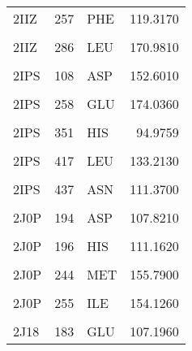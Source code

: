 \begin{table}
\begin{tabular}{lrlr}
			2IIZ & 257 & PHE & 119.3170\\
			\cellcolor{gray!6}{2IIZ} & \cellcolor{gray!6}{284} & \cellcolor{gray!6}{ASP} & \cellcolor{gray!6}{144.2720}\\
			\addlinespace
			2IIZ & 286 & LEU & 170.9810\\
			\cellcolor{gray!6}{2IPS} & \cellcolor{gray!6}{105} & \cellcolor{gray!6}{GLN} & \cellcolor{gray!6}{100.5170}\\
			2IPS & 108 & ASP & 152.6010\\
			\cellcolor{gray!6}{2IPS} & \cellcolor{gray!6}{109} & \cellcolor{gray!6}{HIS} & \cellcolor{gray!6}{93.6174}\\
			2IPS & 258 & GLU & 174.0360\\
			\addlinespace
			\cellcolor{gray!6}{2IPS} & \cellcolor{gray!6}{348} & \cellcolor{gray!6}{ARG} & \cellcolor{gray!6}{87.8395}\\
			2IPS & 351 & HIS & 94.9759\\
			\cellcolor{gray!6}{2IPS} & \cellcolor{gray!6}{354} & \cellcolor{gray!6}{VAL} & \cellcolor{gray!6}{133.4880}\\
			2IPS & 417 & LEU & 133.2130\\
			\cellcolor{gray!6}{2IPS} & \cellcolor{gray!6}{433} & \cellcolor{gray!6}{LEU} & \cellcolor{gray!6}{130.0630}\\
			\addlinespace
			2IPS & 437 & ASN & 111.3700\\
			\cellcolor{gray!6}{2J0P} & \cellcolor{gray!6}{102} & \cellcolor{gray!6}{ARG} & \cellcolor{gray!6}{139.6090}\\
			2J0P & 194 & ASP & 107.8210\\
			\cellcolor{gray!6}{2J0P} & \cellcolor{gray!6}{195} & \cellcolor{gray!6}{VAL} & \cellcolor{gray!6}{111.4460}\\
			2J0P & 196 & HIS & 111.1620\\
			\addlinespace
			\cellcolor{gray!6}{2J0P} & \cellcolor{gray!6}{199} & \cellcolor{gray!6}{PHE} & \cellcolor{gray!6}{116.5200}\\
			2J0P & 244 & MET & 155.7900\\
			\cellcolor{gray!6}{2J0P} & \cellcolor{gray!6}{246} & \cellcolor{gray!6}{PHE} & \cellcolor{gray!6}{127.9200}\\
			2J0P & 255 & ILE & 154.1260\\
			\cellcolor{gray!6}{2J18} & \cellcolor{gray!6}{103} & \cellcolor{gray!6}{PHE} & \cellcolor{gray!6}{111.5310}\\
			\addlinespace
			2J18 & 183 & GLU & 107.1960\\

\end{tabular}
\end{table}
